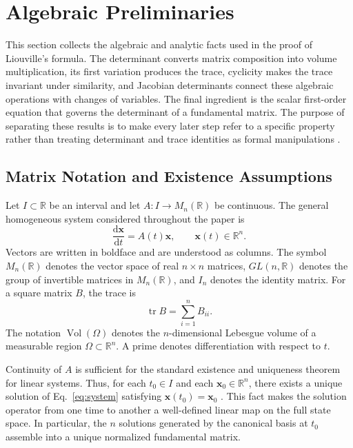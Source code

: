 \documentclass[11pt,a4paper]{article}
\newcommand{\be}{\begin{equation}}
\newcommand{\ee}{\end{equation}}
\newcommand{\lb}[1]{\label{#1}}
\newcommand{\dd}{\mathrm{d}}
\newcommand{\R}{\mathbb{R}}
\DeclareMathOperator{\tr}{tr}
\DeclareMathOperator{\Vol}{Vol}
\theoremstyle{definition}
\numberwithin{equation}{section}
\begin{document}
\section{Algebraic Preliminaries}

This section collects the algebraic and analytic facts used in the proof of Liouville's formula. The determinant converts matrix composition into volume multiplication, its first variation produces the trace, cyclicity makes the trace invariant under similarity, and Jacobian determinants connect these algebraic operations with changes of variables. The final ingredient is the scalar first-order equation that governs the determinant of a fundamental matrix. The purpose of separating these results is to make every later step refer to a specific property rather than treating determinant and trace identities as formal manipulations \cite{horn2013,coddington1955,hartman2002,teschl2012}.

\subsection{Matrix Notation and Existence Assumptions}

Let $I\subset\R$ be an interval and let $A:I\rightarrow M_n(\R)$ be continuous. The general homogeneous system considered throughout the paper is
\be
\frac{\dd\mathbf{x}}{\dd t}=A(t)\mathbf{x},
\qquad
\mathbf{x}(t)\in\R^n.
\lb{eq:system}
\ee
Vectors are written in boldface and are understood as columns. The symbol $M_n(\R)$ denotes the vector space of real $n\times n$ matrices, $GL(n,\R)$ denotes the group of invertible matrices in $M_n(\R)$, and $I_n$ denotes the identity matrix. For a square matrix $B$, the trace is
\be
\tr B=\sum_{i=1}^{n}B_{ii}.
\lb{eq:trace-definition}
\ee
The notation $\Vol(\Omega)$ denotes the $n$-dimensional Lebesgue volume of a measurable region $\Omega\subset\R^n$. A prime denotes differentiation with respect to $t$.

Continuity of $A$ is sufficient for the standard existence and uniqueness theorem for linear systems. Thus, for each $t_0\in I$ and each $\mathbf{x}_0\in\R^n$, there exists a unique solution of Eq.~\eqref{eq:system} satisfying $\mathbf{x}(t_0)=\mathbf{x}_0$ \cite{coddington1955,hartman2002,teschl2012}. This fact makes the solution operator from one time to another a well-defined linear map on the full state space. In particular, the $n$ solutions generated by the canonical basis at $t_0$ assemble into a unique normalized fundamental matrix.
\end{document}
